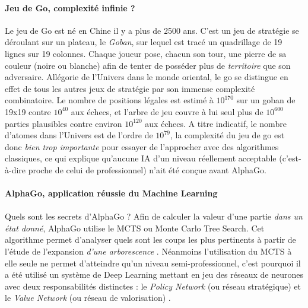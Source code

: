 \paragraph{Jeu de Go, complexité infinie ?} Le jeu de Go est né en Chine il y a plus de 2500 ans. C'est un jeu de stratégie
se déroulant sur un plateau, le \emph{Goban}, sur lequel est tracé un quadrillage de 19 lignes sur 19 colonnes. Chaque joueur
pose, chacun son tour, une pierre de sa couleur (noire ou blanche) afin de tenter de posséder plus de \emph{territoire} que
son adversaire. Allégorie de l'Univers dans le monde oriental, le go se distingue en effet de tous les autres jeux de stratégie
par son immense complexité combinatoire. Le nombre de positions légales est estimé à \begin{math}10^{170}\end{math} sur un goban
de 19x19 contre \begin{math}10^{40}\end{math} aux échecs, et l'arbre de jeu couvre à lui seul plus de \begin{math}10^{600}\end{math}
parties plausibles contre environ \begin{math}10^{120}\end{math} aux échecs. A titre indicatif, le nombre d'atomes dans l'Univers est
de l'ordre de \begin{math}10^{79}\end{math}, la complexité du jeu de go est donc \emph{bien trop importante} pour essayer de l'approcher
avec des algorithmes classiques, ce qui explique qu'aucune IA d'un niveau réellement acceptable (c'est-à-dire proche de celui de
professionnel) n'ait été conçue avant AlphaGo.

\paragraph{AlphaGo, application réussie du Machine Learning}

\paragraph{} Quels sont les secrets d'AlphaGo ? Afin de calculer la valeur 
d'une partie \emph{dans un état donné}, AlphaGo utilise le MCTS ou Monte Carlo Tree Search. Cet algorithme permet d'analyser
quels sont les coups les plus pertinents à partir de l'étude de l'expansion \emph{d'une arborescence} \cite{Heuristics0}.
Néanmoins l'utilisation du MCTS à elle seule ne permet d'atteindre qu'un niveau semi-professionnel, c'est pourquoi il a été
utilisé un système de Deep Learning mettant en jeu des réseaux de neurones avec deux responsabilités distinctes : le
\emph{Policy Network} (ou réseau stratégique) et le \emph{Value Network} (ou réseau de valorisation) \cite{AlphaGo0}.

